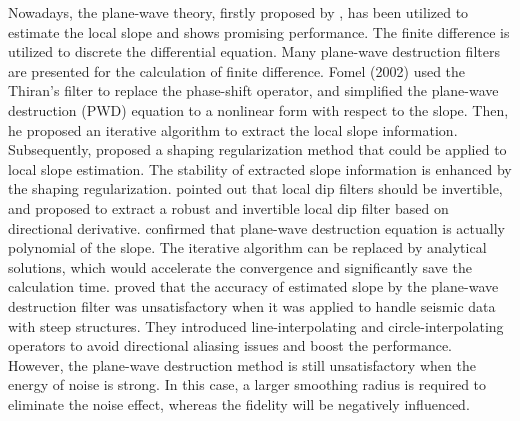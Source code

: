 Nowadays, the plane-wave theory, firstly proposed by \cite{1991Earth}, has been utilized to estimate the local slope and shows promising performance. The finite difference is utilized to discrete the differential equation. Many plane-wave destruction filters are presented for the calculation of finite difference. Fomel (2002) \cite{pwd} used the Thiran’s filter \cite{1971Recursive} to replace the phase-shift operator, and simplified the plane-wave destruction (PWD) equation to a nonlinear form with respect to the slope. Then, he proposed an iterative algorithm to extract the local slope information. 
Subsequently, \cite{Sergey2007} proposed a shaping regularization method that could be applied to local slope estimation. The stability of extracted slope information is enhanced by the shaping regularization. \cite{dave2007} pointed out that local dip filters should be invertible, and proposed to extract a robust and invertible local dip filter based on directional derivative. \cite{2013Accelerated} confirmed that plane-wave destruction equation is actually polynomial of the slope. The iterative algorithm can be replaced by analytical solutions, which would accelerate the convergence and significantly save the calculation time. \cite{2013Omnidirectional} proved that the accuracy of estimated slope by the plane-wave destruction filter was unsatisfactory when it was applied to handle seismic data with steep structures. They introduced line-interpolating and circle-interpolating operators to avoid directional aliasing issues and boost the performance. 
However, the plane-wave destruction method is still unsatisfactory when the energy of noise is strong. In this case, a larger smoothing radius is required to eliminate the noise effect, whereas the fidelity will be negatively influenced. 


